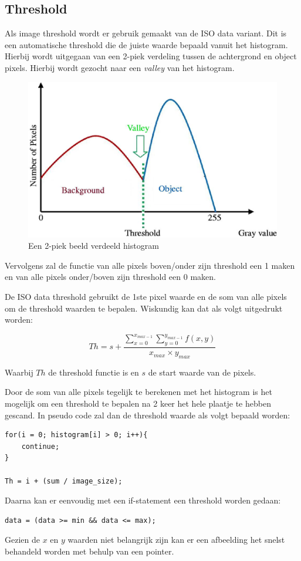 \subsection{Threshold}

Als image threshold wordt er gebruik gemaakt van de ISO data variant. Dit is een
automatische threshold die de juiste waarde bepaald vanuit het histogram. Hierbij
wordt uitgegaan van een 2-piek verdeling tussen de achtergrond en object pixels.
Hierbij wordt gezocht naar een \emph{valley} van het histogram.

\begin{figure}
    \begin{center}
        \includegraphics[scale=0.35]{figures/histogram.png}
    \end{center}
    \caption{Een 2-piek beeld verdeeld histogram}
    \label{fig:histogram}
\end{figure}

Vervolgens zal de functie van alle pixels boven/onder zijn threshold een 1 maken
en van alle pixels onder/boven zijn threshold een 0 maken.

De ISO data threshold gebruikt de 1ste pixel waarde en de som van alle pixels om
de threshold waarden te bepalen. Wiskundig kan dat als volgt uitgedrukt worden:

\[ Th = s + \frac{\sum\limits_{x=0}^{x_{max-1}} \sum\limits_{y=0}^{y_{max-1}} f(x, y)}{x_{max} \times y_{max}} \]

Waarbij $Th$ de threshold functie is en $s$ de start waarde van de pixels.

Door de som van alle pixels tegelijk te berekenen met het histogram is het
mogelijk om een threshold te bepalen na 2 keer het hele plaatje te hebben
gescand. In pseudo code zal dan de threshold waarde als volgt bepaald worden:

\begin{verbatim}
for(i = 0; histogram[i] > 0; i++){
    continue;
}

Th = i + (sum / image_size);
\end{verbatim}

Daarna  kan er eenvoudig met een if-statement een threshold worden gedaan:

\begin{verbatim}
data = (data >= min && data <= max);
\end{verbatim}

Gezien de $x$ en $y$ waarden niet belangrijk zijn kan er een afbeelding het
snelst behandeld worden met behulp van een pointer.
